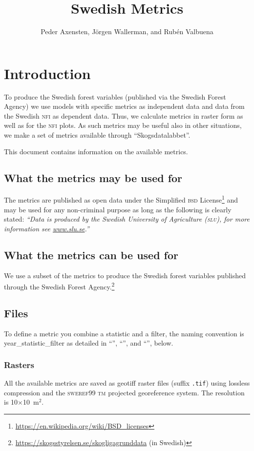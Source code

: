 \documentclass[10pt,english,a4paper
]{article}
\title{Swedish {\lidar} Metrics}
\author{Peder Axensten, Jörgen Wallerman, and Rubén Valbuena}
\newcommand{\download}{“Skogsdatalabbet”}
\newcommand{\mname}[1]{{\small\texttt{#1}}}
\begin{document}
\maketitle


\section{Introduction}\label{introduction}

To produce the Swedish forest variables (published via the Swedish Forest Agency) we use models with specific metrics as independent data and data from the Swedish \textsc{nfi} as dependent data. Thus, we calculate metrics in raster form as well as for the \textsc{nfi} plots. As such metrics may be useful also in other situations, we make a set of metrics available through {\download}. 

This document contains information on the available metrics. 


\subsection{What the metrics may be used for}

The metrics are published as open data under the Simplified \textsc{bsd} License\footnote{\url{https://en.wikipedia.org/wiki/BSD_licenses}} and may be used for any non-criminal purpose as long as the following is clearly stated:
\emph{“Data is produced by the Swedish University of Agriculture (\textsc{slu}), for more information see \url{www.slu.se}.”}


\subsection{What the metrics can be used for}

We use a subset of the metrics to produce the Swedish forest variables published through the Swedish Forest Agency.\footnote{\url{https://skogsstyrelsen.se/skogligagrunddata} (in Swedish)}


\subsection{Files}

To define a metric you combine a statistic and a filter, the naming convention is year\_statistic\_filter as detailed in “”, “”, and “”, below.

\subsubsection{Rasters}
All the available metrics are saved as geotiff raster files (suffix \mname{.tif}) using lossless compression and the \textsc{sweref}99 \textsc{tm} projected georeference system. The resolution is 10$\times$10~m$^2$.
\end{document}
